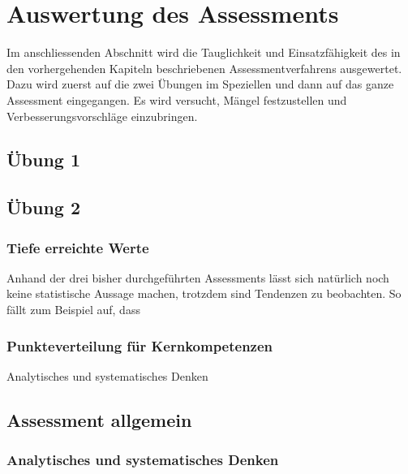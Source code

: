 \chapter{Auswertung des Assessments}

Im anschliessenden Abschnitt wird die Tauglichkeit und Einsatzfähigkeit des in den vorhergehenden Kapiteln beschriebenen Assessmentverfahrens ausgewertet. Dazu wird zuerst auf die zwei Übungen im Speziellen und dann auf das ganze Assessment eingegangen. Es wird versucht, Mängel festzustellen und Verbesserungsvorschläge einzubringen.

\section{Übung 1}
\section{Übung 2}
\subsection{Tiefe erreichte Werte}
Anhand der drei bisher durchgeführten Assessments lässt sich natürlich noch keine statistische Aussage machen, trotzdem sind Tendenzen zu beobachten. So fällt zum Beispiel auf, dass 
\subsection{Punkteverteilung für Kernkompetenzen}
Analytisches und systematisches Denken
\section{Assessment allgemein}
\subsection{Analytisches und systematisches Denken}